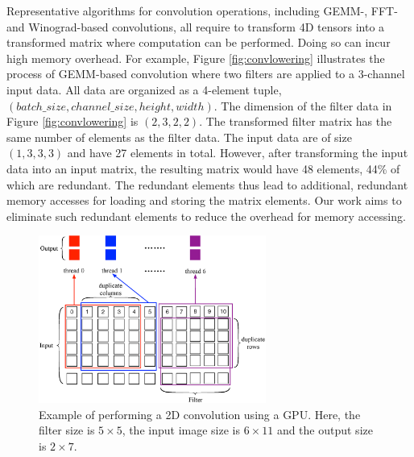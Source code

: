 Representative algorithms for convolution operations, including GEMM-, FFT- and Winograd-based convolutions, all require to transform 4D
tensors into a transformed matrix where computation can be performed. Doing so can incur high memory overhead. For example, Figure
\ref{fig:convlowering} illustrates the process of GEMM-based convolution where two filters are applied to a 3-channel input data. All data
are organized as a 4-element tuple, $(batch\_size, channel\_size, height, width)$. The dimension of the filter data in Figure
\ref{fig:convlowering} is $(2, 3, 2, 2)$. The transformed filter matrix has the same number of elements as the filter data. The input data
are of size $(1, 3, 3, 3)$ and have 27 elements in total. However, after transforming the input data into an input matrix, the resulting
matrix would have 48 elements, 44\% of which are redundant. The redundant elements thus lead to additional, redundant memory accesses for
loading and storing the matrix elements. Our work aims to eliminate such redundant elements to reduce the overhead for memory accessing.


\begin{figure}[t!]
\centering
  \includegraphics[width=0.9\columnwidth,height=5.5cm]{./figure/twostrategies.eps}
  \caption{Example of performing a 2D convolution using a GPU. Here, the filter size is $5 \times 5$, the input image size is $6 \times 11$
  and the output size is $2 \times 7$.}
  \label{fig:twostrategies}
\end{figure}
